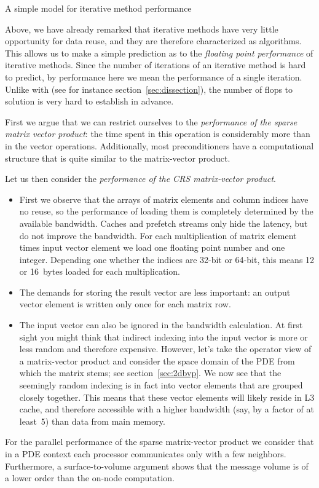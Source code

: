  {A simple model for iterative method performance}

Above, we have already remarked that iterative methods have very little
opportunity for data reuse, and they are therefore characterized as
 algorithms. This allows us to make a simple
prediction as to the
\emph{floating point performance}%
of iterative methods.
Since the number of iterations of an iterative method is hard to predict,
by performance here we mean the performance of a single iteration.
Unlike with 
(see for instance section~\ref{sec:dissection}),
the number of flops to solution is very hard to establish in advance.

First we argue that we can restrict ourselves to the \emph{performance of the sparse
  matrix vector product}:
the time spent in this operation is considerably more than in the vector operations.
Additionally, most preconditioners have a computational structure that is
quite similar to the matrix-vector product.

Let us then consider the \emph{performance of the CRS matrix-vector
  product}.
\begin{itemize}
\item First we observe that the arrays of matrix elements and column indices have no reuse,
  so the performance of loading them is completely determined by the available bandwidth.
  Caches and prefetch streams only hide the latency, but do not improve the bandwidth.
  For
  each multiplication of matrix element times input vector element
  we load one floating point number and one integer. Depending one whether the
  indices are 32-bit or 64-bit, this means 12 or 16~bytes loaded for each multiplication.
\item The demands for storing the result vector are less important: an output vector
  element is written only once for each matrix row.
\item The input vector can also be ignored in the bandwidth calculation.
  At first sight you might think that indirect indexing
  into the input vector is more or less random and therefore expensive.
  However, let's take the operator view of a matrix-vector product
  and consider the space domain of the \ac{PDE} from which the matrix stems;
  see section~\ref{sec:2dbvp}. We now see that the seemingly random indexing
  is in fact into vector elements that are grouped closely together.
  This means that these vector elements will likely reside in L3 cache,
  and therefore accessible with a higher bandwidth (say, by a factor of at least~5)
  than data from main memory.
\end{itemize}
For the parallel performance of the sparse matrix-vector product we
consider that in a \ac{PDE} context each processor communicates only
with a few neighbors. Furthermore, a surface-to-volume argument
shows that the message volume is of a lower order than the on-node
computation.

